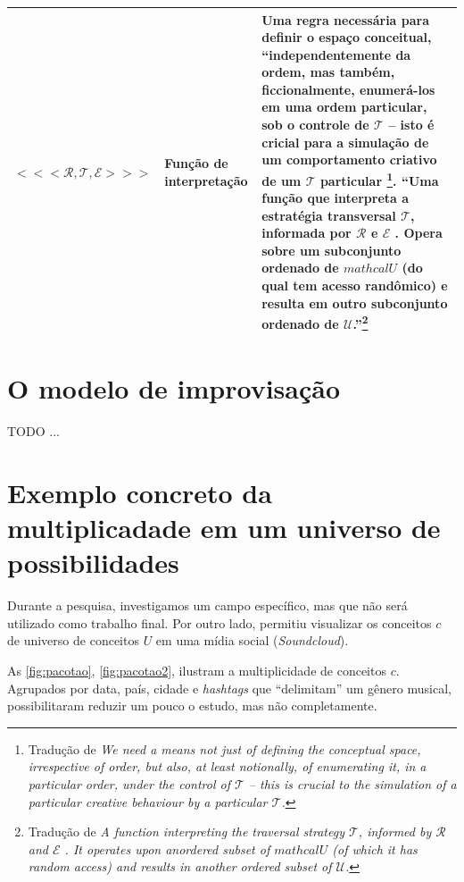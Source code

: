 \begin{table}[!h]
\begin{tabular}{ | p{4cm} | p{5.5cm} | p{5.5cm} |}
    $<<<\mathcal{R}, \mathcal{T}, \mathcal{E}>>>$
    & \tiny{Função de interpretação} 
    & \tiny{Uma regra necessária para definir o espaço conceitual, ``independentemente da ordem, mas também, ficcionalmente, enumerá-los em uma ordem particular, sob o controle de $\mathcal{T}$ -- isto é cricial para a simulação de um comportamento criativo de um $\mathcal{T}$ particular \cite{wiggins_framework_2006} \footnote{Tradução de \emph{We need a means not just of defining the conceptual space, irrespective of order, but also, at least notionally, of enumerating it, in a particular order, under the control of $\mathcal{T}$ -- this is crucial to the simulation of a particular creative behaviour by a particular $\mathcal{T}$.}}. ``Uma função que interpreta a estratégia transversal $\mathcal{T}$, informada por $\mathcal{R}$ e $\mathcal{E}$ . Opera sobre um subconjunto ordenado de $mathcal{U}$ (do qual tem acesso randômico) e resulta em outro subconjunto ordenado de $\mathcal{U}$.''\footnote{Tradução de \emph{A function interpreting the traversal strategy $\mathcal{T}$, informed by $\mathcal{R}$ and $\mathcal{E}$ . It operates upon anordered subset of $mathcal{U}$ (of which it has random access) and results in another ordered subset of $\mathcal{U}$.}}} \\
    \hline
    \hline
   
    \end{tabular}
\label{tab:universodeconceitos}
\end{table}



\section{O modelo de improvisação}

TODO ...

\section{Exemplo concreto da multiplicadade em um universo de possibilidades}

Durante a pesquisa, investigamos um campo específico, mas que não será utilizado como trabalho final. Por outro lado, permitiu visualizar os conceitos  $c$ de universo de conceitos $U$ em uma mídia social (\emph{Soundcloud}).

As \autoref{fig:pacotao}, \autoref{fig:pacotao2}, ilustram a multiplicidade de conceitos $c$. Agrupados por data, país, cidade e \emph{hashtags} que ``delimitam'' um gênero musical, possibilitaram reduzir um pouco o estudo, mas não completamente.

